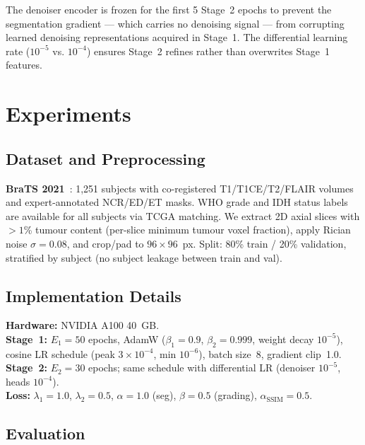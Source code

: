 \documentclass[runningheads]{llncs}
\begin{document}
The denoiser encoder is frozen for the first 5 Stage~2 epochs
to prevent the segmentation gradient — which carries no denoising
signal — from corrupting learned denoising representations acquired
in Stage~1. The differential learning rate ($10^{-5}$ vs. $10^{-4}$)
ensures Stage~2 refines rather than overwrites Stage~1 features.


\section{Experiments}
\label{sec:exp}

\subsection{Dataset and Preprocessing}

\textbf{BraTS 2021}~\cite{brats2021}: 1,251 subjects with
co-registered T1/T1CE/T2/FLAIR volumes and expert-annotated
NCR/ED/ET masks.
WHO grade and IDH status labels are available for all subjects
via TCGA matching.
We extract 2D axial slices with $>1$\% tumour content (per-slice
minimum tumour voxel fraction), apply Rician noise $\sigma{=}0.08$,
and crop/pad to $96{\times}96$~px.
Split: 80\% train / 20\% validation, stratified by subject
(no subject leakage between train and val).

\subsection{Implementation Details}

\noindent\textbf{Hardware:} NVIDIA A100 40~GB.\\
\textbf{Stage~1:} $E_1{=}50$ epochs, AdamW
($\beta_1{=}0.9$, $\beta_2{=}0.999$, weight decay $10^{-5}$),
cosine LR schedule (peak $3{\times}10^{-4}$, min $10^{-6}$),
batch size~8, gradient clip~1.0.\\
\textbf{Stage~2:} $E_2{=}30$ epochs; same schedule with
differential LR (denoiser $10^{-5}$, heads $10^{-4}$).\\
\textbf{Loss:} $\lambda_1{=}1.0$, $\lambda_2{=}0.5$,
$\alpha{=}1.0$ (seg), $\beta{=}0.5$ (grading),
$\alpha_\text{SSIM}{=}0.5$.

\subsection{Evaluation}
\end{document}
